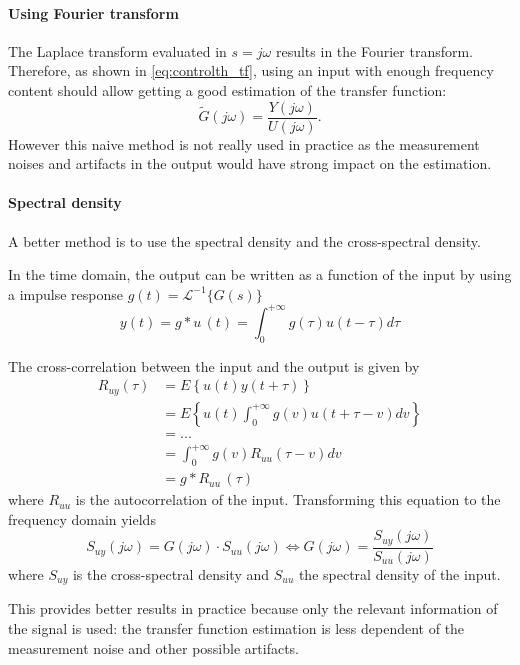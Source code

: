 \paragraph{Using Fourier transform}
The Laplace transform evaluated in $s=j\omega$ results in the Fourier transform. Therefore, as shown in \cref{eq:controlth_tf}, using an input with enough frequency content should allow getting a good estimation of the transfer function:
\begin{equation}
	\tilde{G}(j\omega) = \frac{Y(j\omega)}{U(j\omega)}.
\end{equation}
However this naive method is not really used in practice as the measurement noises and artifacts in the output would have strong impact on the estimation.

\paragraph{Spectral density}
A better method is to use the spectral density and the cross-spectral density.

In the time domain, the output can be written as a function of the input by using a impulse response $g(t) = \mathcal{L}^{-1}\{G(s)\}$
\begin{equation}
	y(t) = g * u\,(t) =  \int_0^{+\infty} g(\tau) u(t-\tau)d\tau
\end{equation}

The cross-correlation between the input and the output is given by
\begin{align}
R_{uy}(\tau) &= E \left\{ u(t) y(t+\tau)\right\} \nonumber\\
			 &= E \left\{ u(t) \int_0^{+\infty} g(v) u(t+\tau-v)dv\right\} \nonumber\\
			 &= ... \nonumber \\ 
			 &= \int_0^{+\infty} g(v) R_{uu}(\tau-v) dv \nonumber\\
			 &= g * R_{uu} \, (\tau)
\end{align}
where $R_{uu}$ is the autocorrelation of the input. Transforming this equation to the frequency domain yields
\begin{equation}
	S_{uy}(j\omega) = G(j\omega)\cdot S_{uu}(j\omega)   \iff 	G(j\omega) = \frac{S_{uy}(j\omega) }{ S_{uu}(j\omega)}
\end{equation}
where $S_{uy}$ is the cross-spectral density and $S_{uu}$ the spectral density of the input.

This provides better results in practice because only the relevant information of the signal is used: the transfer function estimation is less dependent of the measurement noise and other possible artifacts.

